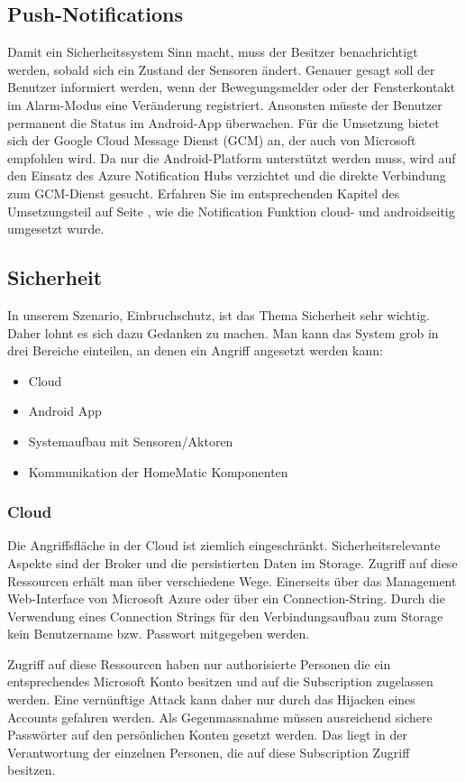 \subsection{Push-Notifications}
Damit ein Sicherheitssystem Sinn macht, muss der Besitzer benachrichtigt werden, sobald sich ein Zustand der Sensoren ändert. Genauer gesagt soll der Benutzer informiert werden, wenn der Bewegungsmelder oder der Fensterkontakt im Alarm-Modus eine Veränderung registriert. Ansonsten müsste der Benutzer permanent die Status im Android-App überwachen. Für die Umsetzung bietet sich der Google Cloud Message Dienst (GCM) an, der auch von Microsoft empfohlen wird. Da nur die Android-Platform unterstützt werden muss, wird auf den Einsatz des Azure Notification Hubs verzichtet und die direkte Verbindung zum GCM-Dienst gesucht. Erfahren Sie im entsprechenden Kapitel des Umsetzungsteil auf Seite \pageref{sec:notificationRealization}, wie die Notification Funktion cloud- und androidseitig umgesetzt wurde.

\subsection{Sicherheit}
In unserem Szenario, Einbruchschutz, ist das Thema Sicherheit sehr wichtig. Daher lohnt es sich dazu  Gedanken zu machen. Man kann das System grob in drei Bereiche einteilen, an denen ein Angriff angesetzt werden kann:
\begin{itemize}
	\item Cloud
	\item Android App
	\item Systemaufbau mit Sensoren/Aktoren
	\item Kommunikation der HomeMatic Komponenten
\end{itemize}

\subsubsection{Cloud}
Die Angriffsfläche in der Cloud ist ziemlich eingeschränkt. Sicherheitsrelevante Aspekte sind der Broker und die persistierten Daten im Storage. Zugriff auf diese Ressourcen erhält man über verschiedene Wege. Einerseits über das Management Web-Interface von Microsoft Azure oder über ein Connection-String. Durch die Verwendung eines Connection Strings für den Verbindungsaufbau zum Storage kein Benutzername bzw. Passwort mitgegeben werden.

Zugriff auf diese Ressourcen haben nur authorisierte Personen die ein entsprechendes Microsoft Konto besitzen und auf die Subscription zugelassen werden. Eine vernünftige Attack kann daher nur durch das Hijacken eines Accounts gefahren werden. Als Gegenmassnahme müssen ausreichend sichere Passwörter auf den persönlichen Konten gesetzt werden. Das liegt in der Verantwortung der einzelnen Personen, die auf diese Subscription Zugriff besitzen.

